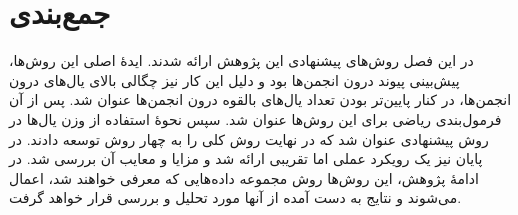 \section{جمع‌بندی}
در این فصل روش‌های پیشنهادی این پژوهش ارائه شدند. ایدهٔ اصلی این روش‌ها، پیش‌بینی پیوند درون انجمن‌ها بود و دلیل این کار نیز چگالی بالای یال‌های درون انجمن‌ها، در کنار پایین‌تر بودن تعداد یال‌های بالقوه درون انجمن‌ها عنوان شد. پس از آن فرمول‌بندی ریاضی برای این روش‌ها عنوان شد. سپس نحوهٔ استفاده از وزن یال‌ها در روش پیشنهادی عنوان شد که در نهایت روش کلی را به چهار روش توسعه دادند. در پایان نیز یک رویکرد عملی اما تقریبی ارائه شد و مزایا و معایب آن بررسی شد. در ادامهٔ پژوهش، این روش‌ها روش مجموعه داده‌هایی که معرفی خواهند شد، اعمال می‌شوند و نتایج به دست آمده از آنها مورد تحلیل و بررسی قرار خواهد گرفت.
